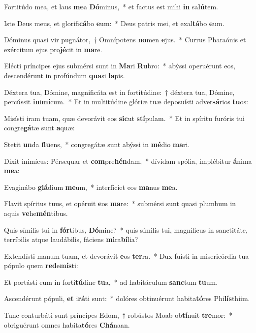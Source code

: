 \item Fortitúdo mea, et laus \textbf{me}a \textbf{Dó}minus,~* et factus est mihi \textbf{in} sa\textbf{lú}tem.
\item Iste Deus meus, et glorifi\textbf{cá}bo \textbf{e}um:~* Deus patris mei, et exal\textbf{tá}bo \textbf{e}um.
\item Dóminus quasi vir pugnátor,~† Omnípotens \textbf{no}men \textbf{e}jus.~* Currus Pharaónis et exércitum ejus pro\textbf{jé}cit in \textbf{ma}re.
\item Elécti príncipes ejus submérsi sunt in \textbf{Ma}ri \textbf{Ru}bro:~* abýssi operuérunt eos, descendérunt in profúndum \textbf{qua}si \textbf{la}pis.
\item Déxtera tua, Dómine, magnificáta est in fortitúdine:~† déxtera tua, Dómine, percússit \textbf{in}i\textbf{mí}cum.~* Et in multitúdine glóriæ tuæ deposuísti adver\textbf{sá}rios \textbf{tu}os:
\item Misísti iram tuam, quæ devorávit eos \textbf{sic}ut \textbf{stí}pulam.~* Et in spíritu furóris tui congre\textbf{gá}tæ sunt \textbf{a}quæ:
\item Stetit \textbf{un}da \textbf{flu}ens,~* congregátæ sunt abýssi in \textbf{mé}dio \textbf{ma}ri.
\item Dixit inimícus: Pérsequar et \textbf{com}pre\textbf{hén}dam,~* dívidam spólia, implébitur \textbf{á}nima \textbf{me}a:
\item Evaginábo \textbf{glá}dium \textbf{me}um,~* interfíciet eos \textbf{ma}nus \textbf{me}a.
\item Flavit spíritus tuus, et opéruit \textbf{e}os \textbf{ma}re:~* submérsi sunt quasi plumbum in aquis \textbf{ve}he\textbf{mén}tibus.
\item Quis símilis tui in \textbf{fór}tibus, \textbf{Dó}mine?~* quis símilis tui, magníficus in sanctitáte, terríbilis atque laudábilis, fáciens \textbf{mi}ra\textbf{bí}lia?
\item Extendísti manum tuam, et devorávit \textbf{e}os \textbf{ter}ra.~* Dux fuísti in misericórdia tua pópulo quem \textbf{red}e\textbf{mís}ti:
\item Et portásti eum in forti\textbf{tú}dine \textbf{tu}a,~* ad habitáculum \textbf{sanc}tum \textbf{tu}um.
\item Ascendérunt pópuli, \textbf{et} i\textbf{rá}ti sunt:~* dolóres obtinuérunt habita\textbf{tó}res Phi\textbf{lís}thiim.
\item Tunc conturbáti sunt príncipes Edom,~† robústos Moab ob\textbf{tí}nuit \textbf{tre}mor:~* obriguérunt omnes habita\textbf{tó}res \textbf{Chá}naan.

